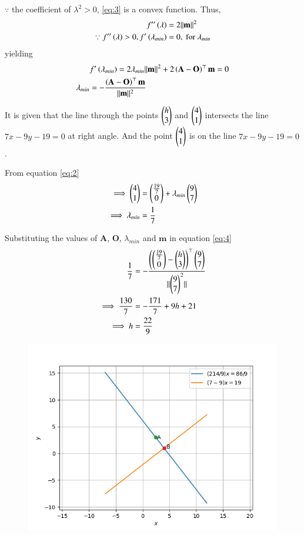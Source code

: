 \documentclass[journal,12pt,twocolumn]{IEEEtran}
\renewcommand{\vec}[1]{\boldsymbol{\mathbf{#1}}}
\begin{document}
$\because$ the coefficient of $\lambda^2> 0$, \eqref{eq:3} is a convex function.
Thus,
\begin{align}
    f^{\prime\prime}\brak{\lambda}                                            & = 2\norm{\vec{m}}^2             \\
    \because f^{\prime\prime}\brak{\lambda} > 0, f^\prime\brak{\lambda_{min}} & = 0, \text{ for } \lambda_{min}
\end{align}
yielding
\begin{align}
                  & f^\prime\brak{\lambda_{min}} =  2\lambda_{min}\norm{\vec{m}}^2 + 2\brak{\vec{A}-\vec{O}}^\top\vec{m}  = 0 \\
    \label{eq:4}
    \lambda_{min} & = -\frac{\brak{\vec{A}-\vec{O}}^\top\vec{m}}{\norm{\vec{m}}^2}
\end{align}

It is given that the line through the points $\begin{pmatrix}h \\ 3\end{pmatrix}$ and $\begin{pmatrix}4 \\ 1\end{pmatrix}$ intersects the line $7{x} - 9{y} - 19 = 0$ at right angle. And the point $\begin{pmatrix}4 \\ 1\end{pmatrix}$ is on the line $7{x} - 9{y} - 19 = 0$.

From equation \eqref{eq:2}
\begin{align}
    \implies \begin{pmatrix}4 \\ 1\end{pmatrix} &= \begin{pmatrix}\frac{19}{7} \\ 0\end{pmatrix} + \lambda_{min}\begin{pmatrix}9 \\ 7\end{pmatrix} \\
    \implies \lambda_{min} &= \frac{1}{7} 
\end{align}


Substituting the values of $\vec{A}$, $\vec{O}$, $\lambda_{min}$ and $\vec{m}$ in equation \eqref{eq:4}
\begin{align}
    \frac{1}{7} &= -\frac{\left(\begin{pmatrix}\frac{19}{7} \\ 0\end{pmatrix} -\begin{pmatrix}h \\ 3\end{pmatrix}\right)^\top\begin{pmatrix}9 \\ 7\end{pmatrix}}{\lVert\begin{pmatrix}9 \\ 7\end{pmatrix}^2\rVert}\\
    \implies \frac{130}{7} &= -\frac{171}{7} + 9{h} + 21\\
    \implies h &= \frac{22}{9}
\end{align}

\begin{figure}[!htb]
    \centering
    \includegraphics[width=\columnwidth]{figs/lines.png}
    \caption{}
    \label{fig:line}
\end{figure}
\end{document}
